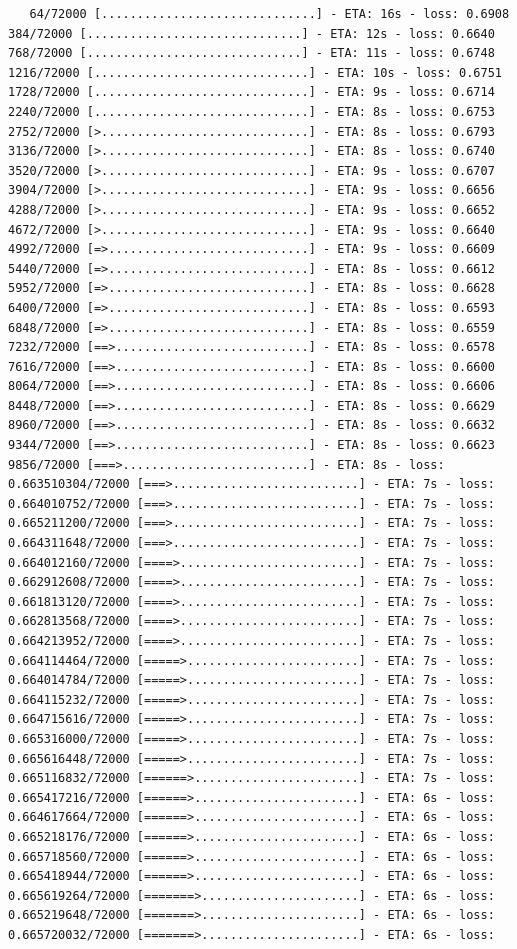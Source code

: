\documentclass[12pt,fleqn]{article}\usepackage{../../common}
\begin{document}
\begin{verbatim}
   64/72000 [..............................] - ETA: 16s - loss: 0.6908  384/72000 [..............................] - ETA: 12s - loss: 0.6640  768/72000 [..............................] - ETA: 11s - loss: 0.6748 1216/72000 [..............................] - ETA: 10s - loss: 0.6751 1728/72000 [..............................] - ETA: 9s - loss: 0.6714  2240/72000 [..............................] - ETA: 8s - loss: 0.6753 2752/72000 [>.............................] - ETA: 8s - loss: 0.6793 3136/72000 [>.............................] - ETA: 8s - loss: 0.6740 3520/72000 [>.............................] - ETA: 9s - loss: 0.6707 3904/72000 [>.............................] - ETA: 9s - loss: 0.6656 4288/72000 [>.............................] - ETA: 9s - loss: 0.6652 4672/72000 [>.............................] - ETA: 9s - loss: 0.6640 4992/72000 [=>............................] - ETA: 9s - loss: 0.6609 5440/72000 [=>............................] - ETA: 8s - loss: 0.6612 5952/72000 [=>............................] - ETA: 8s - loss: 0.6628 6400/72000 [=>............................] - ETA: 8s - loss: 0.6593 6848/72000 [=>............................] - ETA: 8s - loss: 0.6559 7232/72000 [==>...........................] - ETA: 8s - loss: 0.6578 7616/72000 [==>...........................] - ETA: 8s - loss: 0.6600 8064/72000 [==>...........................] - ETA: 8s - loss: 0.6606 8448/72000 [==>...........................] - ETA: 8s - loss: 0.6629 8960/72000 [==>...........................] - ETA: 8s - loss: 0.6632 9344/72000 [==>...........................] - ETA: 8s - loss: 0.6623 9856/72000 [===>..........................] - ETA: 8s - loss: 0.663510304/72000 [===>..........................] - ETA: 7s - loss: 0.664010752/72000 [===>..........................] - ETA: 7s - loss: 0.665211200/72000 [===>..........................] - ETA: 7s - loss: 0.664311648/72000 [===>..........................] - ETA: 7s - loss: 0.664012160/72000 [====>.........................] - ETA: 7s - loss: 0.662912608/72000 [====>.........................] - ETA: 7s - loss: 0.661813120/72000 [====>.........................] - ETA: 7s - loss: 0.662813568/72000 [====>.........................] - ETA: 7s - loss: 0.664213952/72000 [====>.........................] - ETA: 7s - loss: 0.664114464/72000 [=====>........................] - ETA: 7s - loss: 0.664014784/72000 [=====>........................] - ETA: 7s - loss: 0.664115232/72000 [=====>........................] - ETA: 7s - loss: 0.664715616/72000 [=====>........................] - ETA: 7s - loss: 0.665316000/72000 [=====>........................] - ETA: 7s - loss: 0.665616448/72000 [=====>........................] - ETA: 7s - loss: 0.665116832/72000 [======>.......................] - ETA: 7s - loss: 0.665417216/72000 [======>.......................] - ETA: 6s - loss: 0.664617664/72000 [======>.......................] - ETA: 6s - loss: 0.665218176/72000 [======>.......................] - ETA: 6s - loss: 0.665718560/72000 [======>.......................] - ETA: 6s - loss: 0.665418944/72000 [======>.......................] - ETA: 6s - loss: 0.665619264/72000 [=======>......................] - ETA: 6s - loss: 0.665219648/72000 [=======>......................] - ETA: 6s - loss: 0.665720032/72000 [=======>......................] - ETA: 6s - loss: 
\end{verbatim}
\end{document}
